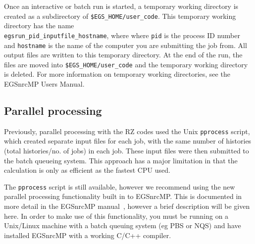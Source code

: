 \documentclass[12pt,twoside]{article}  %
\begin{document}
Once an interactive or batch run is started, a temporary working
directory is created as
a subdirectory of {\tt \$EGS\_HOME/user\_code}.  This temporary working directory
has the name\\
{\tt egsrun\_pid\_inputfile\_hostname}, where where {\tt pid} is the process ID
number and {\tt hostname} is the name of the
computer you are submitting the job from.  All output files are written
to this temporary directory.  At the end of the run, the files are moved into
{\tt \$EGS\_HOME/user\_code} and the temporary working directory is
deleted.  For more information on temporary working directories, see the
EGSnrcMP Users Manual\cite{Ka03}.

\subsection{Parallel processing}
\label{parallelsect}

Previously, parallel processing with the RZ codes used the
Unix {\tt pprocess} script, which created
separate input files for
each job, with the same number of histories
(total histories/no. of jobs) in each job.  These input files were
then submitted to the batch queueing system.  This approach has a
major limitation in that the calculation is only as efficient as the
fastest CPU used.

The {\tt pprocess} script is still available, however we recommend
using the new parallel processing functionality built in to
EGSnrcMP. This is documented in more detail in the
EGSnrcMP manual~\cite{Ka03}, however a brief description will be
given here.  In order to make use of this functionality, you must
be running on a Unix/Linux machine with a batch queuing system
(eg PBS or NQS) and have installed EGSnrcMP with a
working C/C++ compiler.
\end{document}
